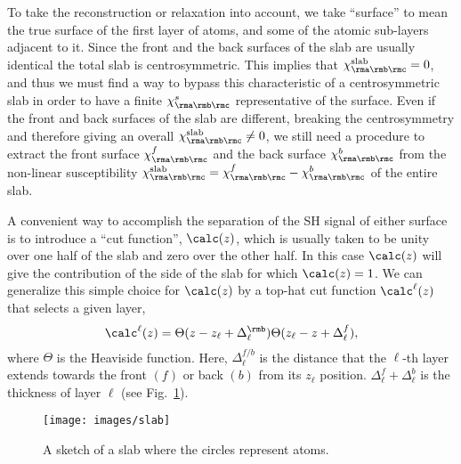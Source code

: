 \documentclass[floatfix,prb,aps,superscriptaddress,11pt,preprint,letterpaper]{revtex4}
\begin{document}
To take the reconstruction or relaxation into account, we take ``surface'' to mean
the true surface of the first layer of atoms, and
some of the atomic sub-layers adjacent to it.
Since the front and the back
surfaces of the slab are usually identical the total slab is
centrosymmetric. This implies that 
$\chi^{\mathrm{slab}}_{\rma\rmb\rmc}=0$, and thus we must
find a way to bypass this characteristic of a centrosymmetric slab 
in order to have a finite $\chi^s_{\rma\rmb\rmc}$ representative of the
surface. Even if the front and back surfaces of the slab 
are different, breaking the centrosymmetry and therefore giving an
overall $\chi^{\mathrm{slab}}_{\rma\rmb\rmc}\ne 0$, we still
need a procedure to extract the front surface $\chi^f_{\rma\rmb\rmc}$
and the back surface $\chi^b_{\rma\rmb\rmc}$ from the non-linear
susceptibility 
$\chi^{\mathrm{slab}}_{\rma\rmb\rmc}=\chi^f_{\rma\rmb\rmc}-\chi^b_{\rma\rmb\rmc}$
 of the entire slab.

A convenient way to accomplish the separation of the SH signal of
either surface is to introduce a ``cut function'', $\calc(z)$, which is 
usually taken to be unity over one half of the slab and zero over 
the other half.\cite{reining_microscopic_1994}
 In this case $\calc(z)$ will give the contribution of the 
side of the slab for which $\calc(z)=1$. We can generalize this 
simple choice for $\calc(z)$ by a top-hat cut function
$\calc^\ell(z)$ that selects a given layer,
\begin{equation}
\label{sz}
\calc^\ell(z)=\Theta(z-z_\ell+\Delta_\ell^{\rmb})
            \Theta(z_\ell-z+\Delta_\ell^f),
\end{equation}
where $\Theta$ is the Heaviside function. Here, $\Delta_\ell^{f/b}$
is the distance that the $\ell$-th layer extends towards the front
$(f)$ or back $(b)$ from its $z_\ell$ position. 
$\Delta_\ell^f+\Delta_\ell^b$ is the thickness of layer $\ell$ 
(see Fig.~\ref{fslab}).
\begin{figure}[b]
\centering
\texttt{[image: images/slab]}
\caption{A sketch of a slab where the circles represent atoms.\label{fslab}}
\end{figure}
\end{document}
